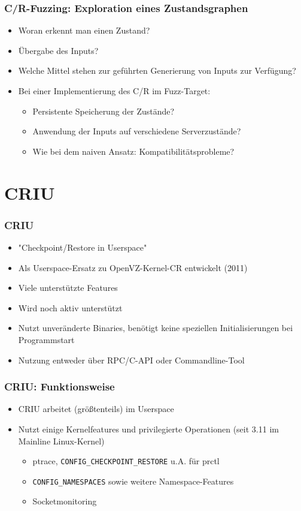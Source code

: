 \documentclass[handout]{beamer}
\begin{document}
\begin{frame}
    \frametitle{C/R-Fuzzing: Exploration eines Zustandsgraphen}
    \begin{itemize}
        \item Woran erkennt man einen Zustand?
        \item Übergabe des Inputs?
        \item Welche Mittel stehen zur geführten Generierung von Inputs zur Verfügung?
        \item Bei einer Implementierung des C/R im Fuzz-Target:
            \begin{itemize}
                \item Persistente Speicherung der Zustände?
                \item Anwendung der Inputs auf verschiedene Serverzustände?
                \item Wie bei dem naiven Ansatz: Kompatibilitätsprobleme?
            \end{itemize}
    \end{itemize}
\end{frame}

\section{CRIU}
\begin{frame}
    \frametitle{CRIU}
    \begin{itemize}
        \item "Checkpoint/Restore in Userspace"
        \item Als Userspace-Ersatz zu OpenVZ-Kernel-CR entwickelt (2011)
        \item Viele unterstützte Features
        \item Wird noch aktiv unterstützt
        \item Nutzt unveränderte Binaries, benötigt keine speziellen Initialisierungen bei Programmstart
        \item Nutzung entweder über RPC/C-API oder Commandline-Tool
    \end{itemize}
\end{frame}

\begin{frame}
    \frametitle{CRIU: Funktionsweise}
    \begin{itemize}
        \item CRIU arbeitet (größtenteils) im Userspace
        \item Nutzt einige Kernelfeatures und privilegierte Operationen (seit 3.11 im Mainline Linux-Kernel)
            \begin{itemize}
                \item ptrace, \texttt{CONFIG\_CHECKPOINT\_RESTORE} u.A. für prctl
                \item \texttt{CONFIG\_NAMESPACES} sowie weitere Namespace-Features
                \item Socketmonitoring
            \end{itemize}
    \end{itemize}
\end{frame}
\end{document}
